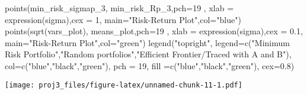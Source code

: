 \documentclass[
]{article}
\newenvironment{Shaded}{\begin{snugshade}}{\end{snugshade}}
\newcommand{\AttributeTok}[1]{\textcolor[rgb]{0.77,0.63,0.00}{#1}}
\newcommand{\DecValTok}[1]{\textcolor[rgb]{0.00,0.00,0.81}{#1}}
\newcommand{\FloatTok}[1]{\textcolor[rgb]{0.00,0.00,0.81}{#1}}
\newcommand{\FunctionTok}[1]{\textcolor[rgb]{0.00,0.00,0.00}{#1}}
\newcommand{\NormalTok}[1]{#1}
\newcommand{\StringTok}[1]{\textcolor[rgb]{0.31,0.60,0.02}{#1}}
\begin{document}
\begin{Shaded}
\begin{Highlighting}[]
\FunctionTok{points}\NormalTok{(min\_risk\_sigmap\_3, min\_risk\_Rp\_3,}\AttributeTok{pch=}\DecValTok{19}\NormalTok{ , }\AttributeTok{xlab =} \FunctionTok{expression}\NormalTok{(sigma),}\AttributeTok{cex =} \DecValTok{1}\NormalTok{, }\AttributeTok{main=}\StringTok{"Risk{-}Return Plot"}\NormalTok{,}\AttributeTok{col=}\StringTok{"blue"}\NormalTok{) }
\FunctionTok{points}\NormalTok{(}\FunctionTok{sqrt}\NormalTok{(vars\_plot), means\_plot,}\AttributeTok{pch=}\DecValTok{19}\NormalTok{ , }\AttributeTok{xlab =} \FunctionTok{expression}\NormalTok{(sigma),}\AttributeTok{cex =} \FloatTok{0.1}\NormalTok{, }\AttributeTok{main=}\StringTok{"Risk{-}Return Plot"}\NormalTok{,}\AttributeTok{col=}\StringTok{"green"}\NormalTok{)}
\FunctionTok{legend}\NormalTok{(}\StringTok{"topright"}\NormalTok{, }
       \AttributeTok{legend=}\FunctionTok{c}\NormalTok{(}\StringTok{"Minimum Risk Portfolio"}\NormalTok{,}\StringTok{"Random portfolios"}\NormalTok{,}\StringTok{"Efficient Frontier/Traced with A and B"}\NormalTok{),}
       \AttributeTok{col=}\FunctionTok{c}\NormalTok{(}\StringTok{"blue"}\NormalTok{,}\StringTok{"black"}\NormalTok{,}\StringTok{"green"}\NormalTok{),}
       \AttributeTok{pch =} \DecValTok{19}\NormalTok{,}
       \AttributeTok{fill =}\FunctionTok{c}\NormalTok{(}\StringTok{"blue"}\NormalTok{,}\StringTok{"black"}\NormalTok{,}\StringTok{"green"}\NormalTok{),}
       \AttributeTok{cex=}\FloatTok{0.8}\NormalTok{)}
\end{Highlighting}
\end{Shaded}

\texttt{[image: proj3\_files/figure-latex/unnamed-chunk-11-1.pdf]}
\end{document}
